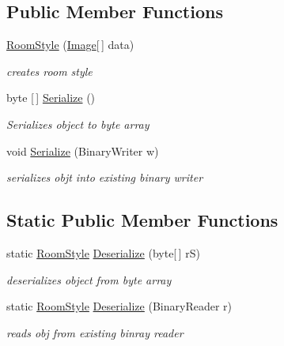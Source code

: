 \subsection*{Public Member Functions}
\begin{DoxyCompactItemize}
\item 
\mbox{\hyperlink{class_virt_muse_web_1_1_utility_1_1_room_style_ae2bc5b82887f4acdd9d02432fb7561bd}{Room\+Style}} (\mbox{\hyperlink{class_virt_muse_web_1_1_utility_1_1_image}{Image}}\mbox{[}$\,$\mbox{]} data)
\begin{DoxyCompactList}\small\item\em creates room style \end{DoxyCompactList}\item 
byte \mbox{[}$\,$\mbox{]} \mbox{\hyperlink{class_virt_muse_web_1_1_utility_1_1_room_style_afd4af2d8bf8884cc7c0c2e481ff76a9d}{Serialize}} ()
\begin{DoxyCompactList}\small\item\em Serializes object to byte array \end{DoxyCompactList}\item 
void \mbox{\hyperlink{class_virt_muse_web_1_1_utility_1_1_room_style_a01fa6d16e13112982a6f662367d0404e}{Serialize}} (Binary\+Writer w)
\begin{DoxyCompactList}\small\item\em serializes objt into existing binary writer \end{DoxyCompactList}\end{DoxyCompactItemize}
\subsection*{Static Public Member Functions}
\begin{DoxyCompactItemize}
\item 
static \mbox{\hyperlink{class_virt_muse_web_1_1_utility_1_1_room_style}{Room\+Style}} \mbox{\hyperlink{class_virt_muse_web_1_1_utility_1_1_room_style_ababd66b3bdab2432fc188a78f75272e6}{Deserialize}} (byte\mbox{[}$\,$\mbox{]} rS)
\begin{DoxyCompactList}\small\item\em deserializes object from byte array \end{DoxyCompactList}\item 
static \mbox{\hyperlink{class_virt_muse_web_1_1_utility_1_1_room_style}{Room\+Style}} \mbox{\hyperlink{class_virt_muse_web_1_1_utility_1_1_room_style_a7d3b431f6a957ca8ed9e4760085c8358}{Deserialize}} (Binary\+Reader r)
\begin{DoxyCompactList}\small\item\em reads obj from existing binray reader \end{DoxyCompactList}\end{DoxyCompactItemize}
